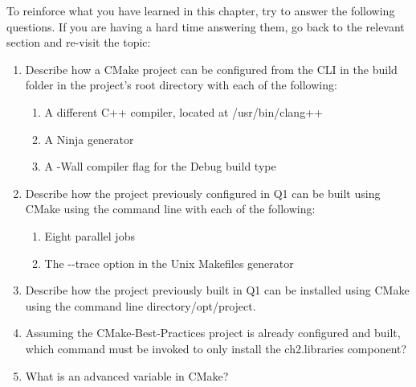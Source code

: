 To reinforce what you have learned in this chapter, try to answer the following questions. If you are having a hard time answering them, go back to the relevant section and re-visit the topic:

\begin{enumerate}
\item 
Describe how a CMake project can be configured from the CLI in the build folder in the project's root directory with each of the following:

\begin{enumerate}[label=\Alph*.]
\item 
A different C++ compiler, located at /usr/bin/clang++

\item 
A Ninja generator

\item 
A -Wall compiler flag for the Debug build type
\end{enumerate}

\item 
Describe how the project previously configured in Q1 can be built using CMake using the command line with each of the following:

\begin{enumerate}[label=\Alph*.]
\item 
Eight parallel jobs

\item 
The -{}-trace option in the Unix Makefiles generator
\end{enumerate}

\item 
Describe how the project previously built in Q1 can be installed using CMake using the command line directory/opt/project.

\item 
Assuming the CMake-Best-Practices project is already configured and built, which command must be invoked to only install the ch2.libraries component?

\item 
What is an advanced variable in CMake?
\end{enumerate}